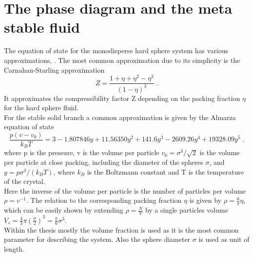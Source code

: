 \section{The phase diagram and the meta stable fluid}
\label{sec:HS_phase_diagram}
The equation of state for the monodisperse hard sphere system has various approximations, . The most common approximation due to its simplicity is the Carnahan-Starling approximation
\begin{equation}
\label{eqn:CS}
Z=\frac{1+\eta+\eta^2-\eta^3}{(1-\eta)^3} \; \text{.}
\end{equation}
It approximates the compressibility factor Z depending on the packing fraction $\eta$ for the hard sphere fluid.\\

For the stable solid branch a common approximation is given by the Almarza equation of state 
\begin{equation}
\frac{p(v-v_0)}{k_B T} = 3 - 1.807846 y + 11.56350 y^2 + 141.6 y^3 - 2609.26 y^4 + 19328.09 y^5 \; \text{.}
\end{equation}
where p is the pressure, v is the volume per particle $v_0=\sigma^3/\sqrt{2}$ is the volume per particle at close packing, including the diameter of the spheres $\sigma$, and $y=p \sigma^3 / (k_B T)$, where $k_B$ is the Boltzmann constant and T is the temperature of the crystal.\\
Here the inverse of the volume per particle is the number of particles per volume $\rho = v^{-1}$. The relation to the corresponding packing fraction $\eta$ is given by $\rho = \frac{6}{ \pi} \eta$, which can be easily shown by extending $\rho = \frac{N}{V}$ by a single particles volume $V_s = \frac{4}{3} \pi \left(\frac{\sigma}{2}\right)^3 = \frac{\pi}{6} \sigma^3$.\\
Within the thesis mostly the volume fraction is used as it is the most common parameter for describing the system. Also the sphere diameter $\sigma$ is used as unit of length.\\ 


